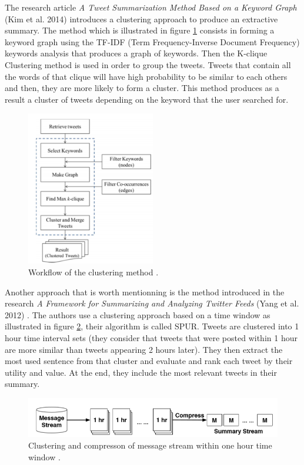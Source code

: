\documentclass[runningheads]{llncs}
\begin{document}
The research article \textit{A Tweet Summarization Method Based on a Keyword
Graph} (Kim et al. 2014) \cite{kim_tweet_2014} introduces a clustering approach
to produce an extractive summary. The method which is illustrated in figure
\ref{fig:fig4} consists in forming a keyword graph using the TF-IDF (Term
Frequency-Inverse Document Frequency) keywords analysis that produces a graph
of keywords. Then the K-clique Clustering method is used in order to group the
tweets. Tweets that contain all the words of that clique will have high
probability to be similar to each others and then, they are more likely to form
a cluster. This method produces as a result a cluster of tweets depending on
the keyword that the user searched for.

\begin{figure}[H]
    \centering
    \includegraphics[width=0.5\textwidth]{fig4.png}
    \caption{Workflow of the clustering method \cite{kim_tweet_2014}.}
    \label{fig:fig4}
\end{figure}

Another approach that is worth mentionning is the method introduced in the
research \textit{A Framework for Summarizing and Analyzing Twitter Feeds} (Yang
et al. 2012) \cite{yang_framework_2012}.
The authors use a clustering approach based on a time window as illustrated in
figure \ref{fig:fig5}, their algorithm is called SPUR. Tweets are clustered into 1
hour time interval sets (they consider that tweets that were posted within 1
hour are more similar than tweets appearing 2 hours later).  They then extract
the most used sentence from that cluster and evaluate and rank each tweet by
their utility and value. At the end, they include the most relevant tweets in
their summary.

\begin{figure}[H]
    \includegraphics[width=\textwidth]{fig5.png}
    \caption{Clustering and compresson of message stream within one hour time
    window \cite{yang_framework_2012}.}
    \label{fig:fig5}
\end{figure}
\end{document}
